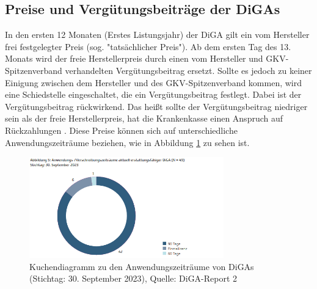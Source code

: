 \documentclass{article}
\begin{document}
		\subsection{Preise und Vergütungsbeiträge der DiGAs}  
			In den ersten 12 Monaten (Erstes Listungsjahr) der DiGA gilt ein vom Hersteller frei festgelegter Preis (sog. "tatsächlicher Preis"). Ab dem ersten Tag des 13. Monats wird der freie Herstellerpreis durch einen vom Hersteller und GKV-Spitzenverband verhandelten Vergütungsbeitrag ersetzt. Sollte es jedoch zu keiner Einigung zwischen dem Hersteller und des GKV-Spitzenverband kommen, wird eine Schiedstelle eingeschaltet, die ein Vergütungsbeitrag festlegt. Dabei ist der Vergütungsbeitrag rückwirkend. Das heißt sollte der Vergütungsbeitrag niedriger sein als der freie Herstellerpreis, hat die Krankenkasse einen Anspruch auf Rückzahlungen \cite[vgl. S. 11]{TK-Report-2}. Diese Preise können sich auf unterschiedliche Anwendungszeiträume beziehen, wie in Abbildung \ref{Abb-andwendungszeiträume-diga} zu sehen ist. 
			\begin{figure}[hbtp]
				\centering
				\includegraphics[width=0.75\textwidth]{./grafiken/anwendungszeitraume_diga}
				\caption[Anwendungszeiträume von DiGAs]{Kuchendiagramm zu den Anwendungszeiträume von DiGAs (Stichtag: 30. September 2023), Quelle: DiGA-Report 2 \cite{TK-Report-2}}
				\label{Abb-andwendungszeiträume-diga}
			\end{figure}
\end{document}
